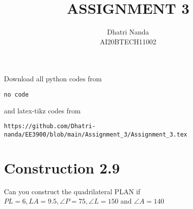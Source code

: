 \documentclass[journal,12pt,twocolumn]{IEEEtran}
\begin{document}
     \def\centbox#1{\makebox[0in]{#1}}
     \def\topbox#1{\raisebox{-\baselineskip}[0in][0in]{#1}}
     \def\midbox#1{\raisebox{-0.5\baselineskip}[0in][0in]{#1}}
\vspace{3cm}
\title{ASSIGNMENT 3}
\author{Dhatri Nanda \\ AI20BTECH11002}
\maketitle
\newpage
\bigskip
\renewcommand{\thefigure}{\theenumi}
\renewcommand{\thetable}{\theenumi}
Download all python codes from 
\begin{lstlisting}
no code
\end{lstlisting}
%
and latex-tikz codes from 
%
\begin{lstlisting}
https://github.com/Dhatri-nanda/EE3900/blob/main/Assignment_3/Assignment_3.tex
\end{lstlisting}
\section{Construction 2.9}
Can you construct the quadrilateral PLAN if $PL = 6, LA = 9.5, \angle P = 75, \angle L = 150$ and $ \angle A = 140$ 
%
\end{document}
